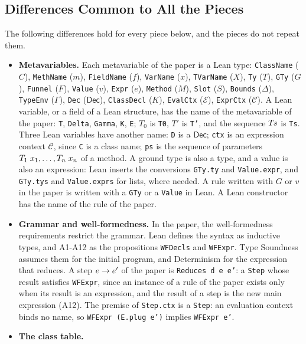 \subsection{Differences Common to All the Pieces}
\label{app:lean:common}
The following differences hold for every piece below, and the pieces do not repeat them.
\begin{itemize}
\item \textbf{Metavariables.}
Each metavariable of the paper is a Lean type: \texttt{ClassName} ($C$), \texttt{MethName} ($m$), \texttt{FieldName} ($f$), \texttt{VarName} ($x$), \texttt{TVarName} ($X$), \texttt{Ty} ($T$), \texttt{GTy} ($G$), \texttt{Funnel} ($F$), \texttt{Value} ($v$), \texttt{Expr} ($e$), \texttt{Method} ($M$), \texttt{Slot} ($S$), \texttt{Bounds} ($\Delta$), \texttt{TypeEnv} ($\Gamma$), \texttt{Dec} ($\mathsf{Dec}$), \texttt{ClassDecl} ($K$), \texttt{EvalCtx} ($\mathcal{E}$), \texttt{ExprCtx} ($\mathcal{C}$).
A Lean variable, or a field of a Lean structure, has the name of the metavariable of the paper: \texttt{T}, \texttt{Delta}, \texttt{Gamma}, \texttt{K}, \texttt{E}; $T_0$ is \texttt{T0}, $T'$ is \texttt{T'}, and the sequence $T\mkern-2mu s$ is \texttt{Ts}.
Three Lean variables have another name: \texttt{D} is a $\mathsf{Dec}$; \texttt{ctx} is an expression context $\mathcal{C}$, since \texttt{C} is a class name; \texttt{ps} is the sequence of parameters $T_1\mskip5mu x_1,\ldots,T_n\mskip5mu x_n$ of a method.
A ground type is also a type, and a value is also an expression: Lean inserts the conversions \texttt{GTy.ty} and \texttt{Value.expr}, and \texttt{GTy.tys} and \texttt{Value.exprs} for lists, where needed.
A rule written with $G$ or $v$ in the paper is written with a \texttt{GTy} or a \texttt{Value} in Lean.
A Lean constructor has the name of the rule of the paper.
\item \textbf{Grammar and well-formedness.}
In the paper, the well-formedness requirements restrict the grammar.
Lean defines the syntax as inductive types, and A1-A12 as the propositions \texttt{WFDecls} and \texttt{WFExpr}.
Type Soundness assumes them for the initial program, and Determinism for the expression that reduces.
A step $e\rightarrow e'$ of the paper is \texttt{Reduces d e e'}: a \texttt{Step} whose result satisfies \texttt{WFExpr}, since an instance of a rule of the paper exists only when its result is an expression, and the result of a step is the new main expression (A12).
The premise of \texttt{Step.ctx} is a \texttt{Step}: an evaluation context binds no name, so \texttt{WFExpr (E.plug e')} implies \texttt{WFExpr e'}.
\item \textbf{The class table.}

\end{itemize}

